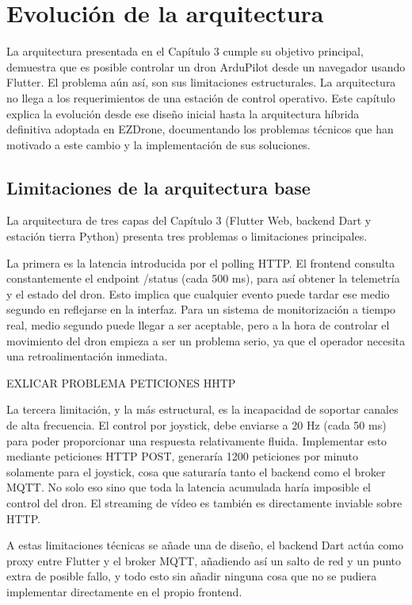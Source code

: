 \chapter{Evolución de la arquitectura}
La arquitectura presentada en el Capítulo 3 cumple su objetivo principal, demuestra que es posible controlar un dron ArduPilot desde un navegador usando Flutter. El problema aún así, son sus limitaciones estructurales. La arquitectura no llega a los requerimientos de una estación de control operativo. Este capítulo explica la evolución desde ese diseño inicial hasta la arquitectura híbrida definitiva adoptada en EZDrone, documentando los problemas técnicos que han motivado a este cambio y la implementación de sus soluciones.

\section{Limitaciones de la arquitectura base}
La arquitectura de tres capas del Capítulo 3 (Flutter Web, backend Dart y estación tierra Python) presenta tres problemas o limitaciones principales.

La primera es la latencia introducida por el polling HTTP. El frontend consulta constantemente el endpoint /status (cada 500 ms), para así obtener la telemetría y el estado del dron. Esto implica que cualquier evento puede tardar ese medio segundo en reflejarse en la interfaz. Para un sistema de monitorización a tiempo real, medio segundo puede llegar a ser aceptable, pero a la hora de controlar el movimiento del dron empieza a ser un problema serio, ya que el operador necesita una retroalimentación inmediata.

EXLICAR PROBLEMA PETICIONES HHTP

La tercera limitación, y la más estructural, es la incapacidad de soportar canales de alta frecuencia. El control por joystick, debe enviarse a 20 Hz (cada 50 ms) para poder proporcionar una respuesta relativamente fluida. Implementar esto mediante peticiones HTTP POST, generaría 1200 peticiones por minuto solamente para el joystick, cosa que saturaría tanto el backend como el broker MQTT. No solo eso sino que toda la latencia acumulada haría imposible el control del dron. El streaming de vídeo es también es directamente inviable sobre HTTP.

A estas limitaciones técnicas se añade una de diseño, el backend Dart actúa como proxy entre Flutter y el broker MQTT, añadiendo así un salto de red y un punto extra de posible fallo, y todo esto sin añadir ninguna cosa que no se pudiera implementar directamente en el propio frontend.

